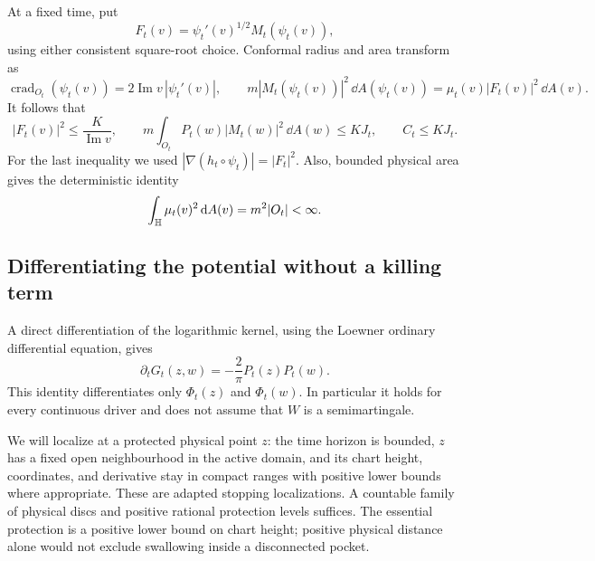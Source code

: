 At a fixed time, put
\[
 F_t(v)=\psi_t'(v)^{1/2}M_t(\psi_t(v)),
\]
using either consistent square-root choice.  Conformal radius and area
transform as
\begin{equation}
 \operatorname{crad}_{O_t}(\psi_t(v))=2\operatorname{Im}v\,|\psi_t'(v)|,
 \qquad
 m|M_t(\psi_t(v))|^2\,\dd A(\psi_t(v))
       =\mu_t(v)|F_t(v)|^2\,\dd A(v).
 \label{cal:changes-of-variables}
\end{equation}
It follows that
\begin{equation}
 |F_t(v)|^2\leq\frac K{\operatorname{Im}v},
 \qquad
 m\int_{O_t}P_t(w)|M_t(w)|^2\,\dd A(w)\leq KJ_t,
 \qquad C_t\leq KJ_t.
 \label{cal:poisson-control}
\end{equation}
For the last inequality we used
$|\nabla(h_t\circ\psi_t)|=|F_t|^2$.
Also, bounded physical area gives the deterministic identity
\begin{equation}
 \int_{\mathbb H}\mu_t(v)^2\,\mathrm d A(v)=m^2|O_t|<\infty.
 \label{cal:mu-L2}
\end{equation}

\subsection{Differentiating the potential without a killing term}
\label{cal:cutoff-subsection}

A direct differentiation of the logarithmic kernel, using the Loewner
ordinary differential equation, gives
\begin{equation}
 \partial_tG_t(z,w)=-\frac2\pi P_t(z)P_t(w).
 \label{cal:hadamard}
\end{equation}
This identity differentiates only $\Phi_t(z)$ and $\Phi_t(w)$.
In particular it holds for every continuous driver and does not assume
that $W$ is a semimartingale.

We will localize at a protected physical point $z$: the time horizon is
bounded, $z$ has a fixed open neighbourhood in the active domain, and
its chart height, coordinates, and derivative stay in compact ranges
with positive lower bounds where appropriate.  These are adapted
stopping localizations.  A countable family of physical discs and
positive rational protection levels suffices.  The essential
protection is a positive lower bound on chart height; positive physical
distance alone would not exclude swallowing inside a disconnected
pocket.

